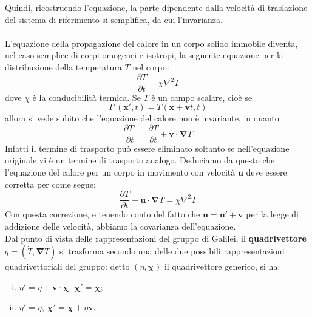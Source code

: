 \documentclass[a4paper,11pt]{book}
\theoremstyle{plain}
\theoremstyle{definition}
\begin{document}
Quindi, ricostruendo l'equazione, la parte dipendente dalla velocità di traslazione del sistema di riferimento si semplifica, da cui l'invarianza. 
\\ \\
L'equazione della propagazione del calore in un corpo solido immobile diventa, nel caso 
semplice di corpi omogenei e isotropi, la seguente equazione per la distribuzione della 
temperatura $T$ nel corpo:
\[
\frac{\partial T}{\partial t}=\chi \nabla ^2 T
\] 
dove $\chi$ è la conducibilità termica. Se $T$ è un campo scalare, cioè se
\[
T'(\textbf{x}',t)=T(\textbf{x}+\textbf{v}t,t)
\]
allora si vede subito che l'equazione del calore non è invariante, in quanto
\[
\frac{\partial T'}{\partial t}=\frac{\partial T}{\partial t}+\textbf{v}\cdot \boldsymbol{\nabla} T
\]
Infatti il termine di trasporto può essere eliminato soltanto se nell'equazione originale vi è un termine di trasporto analogo. Deduciamo da questo che l'equazione del calore per un corpo in movimento con velocità $\textbf{u}$ deve essere corretta per come segue:
\[
\frac{\partial T}{\partial t}+\textbf{u}\cdot \boldsymbol{\nabla} T=\chi \nabla ^2 T
\]
Con questa correzione, e tenendo conto del fatto che $\textbf{u}=\textbf{u}'+\textbf{v}$ per la legge di addizione delle velocità, abbiamo la covarianza dell'equazione. 
\\
Dal punto di vista delle rappresentazioni del gruppo di Galilei, il \textbf{quadrivettore} $q=(\dot{T},\boldsymbol{\nabla}T)$ si trasforma secondo una delle due possibili rappresentazioni quadrivettoriali del gruppo: detto $(\eta,\boldsymbol{\chi})$ il quadrivettore generico, si ha:
\begin{enumerate}[i.]
	\item $\eta'=\eta+\textbf{v}\cdot \boldsymbol{\chi}$, $\boldsymbol{\chi}'=\boldsymbol{\chi}$;
	\item $\eta'=\eta$, $\boldsymbol{\chi}'=\boldsymbol{\chi}+\eta\textbf{v}$.
\end{enumerate}
\end{document}
